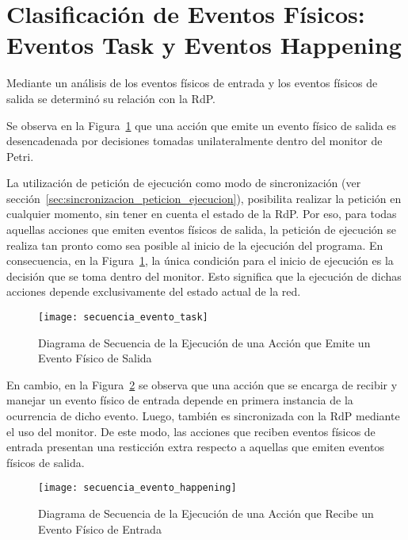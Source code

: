 \section{Clasificación de Eventos Físicos: \\ Eventos Task y Eventos Happening}
\label{sec:clasificacion_eventos_fisicos} 
Mediante un análisis de los eventos físicos de entrada y los eventos
físicos de salida se determinó su relación con la RdP. 

Se observa en la Figura~\ref{fig:actividades_evento_task} que una acción que
emite un evento físico de salida es desencadenada por decisiones tomadas
unilateralmente dentro del monitor de Petri.

La utilización de petición de ejecución como modo de sincronización (ver
sección~\ref{sec:sincronizacion_peticion_ejecucion}), posibilita realizar la
petición en cualquier momento, sin tener en cuenta el estado de la RdP. Por eso,
para todas aquellas acciones que emiten eventos físicos de salida, la petición
de ejecución se realiza tan pronto como sea posible al inicio de la ejecución del
programa. En consecuencia, en la Figura~\ref{fig:actividades_evento_task}, la
única condición para el inicio de ejecución es la decisión que se toma dentro
del monitor. Esto significa que la ejecución de dichas acciones depende
exclusivamente del estado actual de la red.

\begin{figure}[H]
	\centering
	\texttt{[image: secuencia\_evento\_task]}
	\caption{Diagrama de Secuencia de la Ejecución de una Acción que Emite un
	Evento Físico de Salida}
	\label{fig:actividades_evento_task}
\end{figure}

En cambio, en la Figura~\ref{fig:actividades_evento_happening} se observa que
una acción que se encarga de recibir y manejar un evento físico de entrada
depende en primera instancia de la ocurrencia de dicho evento. Luego, también es
sincronizada con la RdP mediante el uso del monitor. De este modo, las
acciones que reciben eventos físicos de entrada presentan una resticción extra
respecto a aquellas que emiten eventos físicos de salida.



\begin{figure}[H]
	\centering
	\texttt{[image: secuencia\_evento\_happening]}
	\caption{Diagrama de Secuencia de la Ejecución de una Acción que Recibe un
	Evento Físico de Entrada}
	\label{fig:actividades_evento_happening}
\end{figure}

